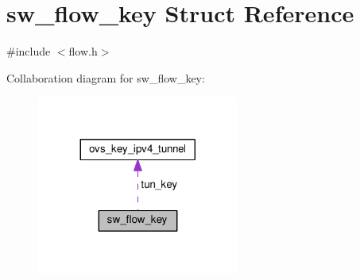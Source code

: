 \hypertarget{structsw__flow__key}{}\section{sw\+\_\+flow\+\_\+key Struct Reference}
\label{structsw__flow__key}


{\ttfamily \#include $<$flow.\+h$>$}



Collaboration diagram for sw\+\_\+flow\+\_\+key\+:
\nopagebreak
\begin{figure}[H]
\begin{center}
\leavevmode
\includegraphics[width=188pt]{structsw__flow__key__coll__graph}
\end{center}
\end{figure}
